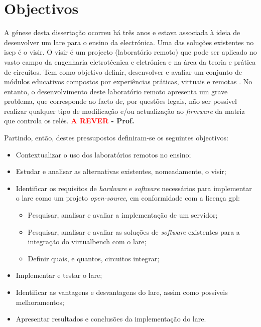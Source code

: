 \section{Objectivos}
\label{sec:Objectivos}
A génese desta dissertação ocorreu há três anos e estava associada à ideia de desenvolver um \acrfull{lare} para o ensino da electrónica. Uma das soluções existentes no \acrfull{isep} é o \acrfull{visir}.
O \acrshort{visir} é um projecto (\acrshort{laboratório remoto}) que pode ser aplicado no vasto campo da engenharia eletrotécnica e eletrónica e na área da teoria e prática de circuitos. Tem como objetivo definir, desenvolver e avaliar um conjunto de módulos educativos compostos por experiências práticas, virtuais e remotas \cite{visirisep}.
No entanto, o desenvolvimento deste \acrshort{laboratório remoto} apresenta um grave problema, que corresponde ao facto de, por questões legais, não ser possível realizar qualquer tipo de modificação e/ou actualização ao \textit{firmware} da matriz que controla os relés. \textbf{\textcolor{red}{A REVER} - Prof.}

Partindo, então, destes pressupostos definiram-se os seguintes objectivos:
\begin{itemize}
    \item Contextualizar o uso dos laboratórios remotos no ensino;
    \item Estudar e analisar as alternativas existentes, nomeadamente, o \acrshort{visir};
    \item Identificar os requisitos de \textit{hardware} e \textit{software} necessários para implementar o \acrshort{lare} como um projeto \textit{open-source}, em conformidade com a licença \acrfull{gpl}:
    \begin{itemize}
        \item Pesquisar, analisar e avaliar a implementação de um servidor;
        \item Pesquisar, analisar e avaliar as soluções de \textit{software} existentes para a integração do \acrfull{virtualbench} com o \acrshort{lare};
         \item Definir quais, e quantos, circuitos integrar;
    \end{itemize}
    \item Implementar e testar o \acrshort{lare};
    \item Identificar as vantagens e desvantagens do \acrshort{lare}, assim como possíveis melhoramentos;
    \item Apresentar resultados e conclusões da implementação do \acrshort{lare}.
\end{itemize}

